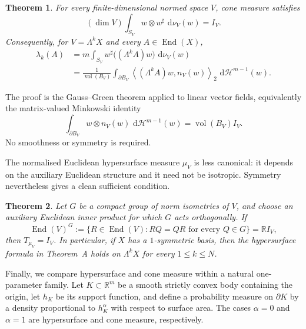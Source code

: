 \documentclass[11pt,a4paper]{amsart}
\numberwithin{equation}{section}
\theoremstyle{plain}
\newtheorem{maintheorem}{Theorem}
\theoremstyle{definition}
\theoremstyle{remark}
\DeclareMathOperator{\End}{End}
\DeclareMathOperator{\vol}{vol}
\newcommand{\R}{\mathbb{R}}
\newcommand{\dd}{\,\mathrm{d}}
\newcommand{\Id}{I}
\newcommand{\ip}[2]{\left\langle #1,#2\right\rangle_2}
\begin{document}
\begin{maintheorem}\label{thm:intro-B}
For every finite-dimensional normed space $V$, cone measure satisfies
\[
(\dim V)\int_{S_V}w\otimes w^\sharp\,\dd\nu_V(w)=\Id_V.
\]
Consequently, for $V=\Lambda^kX$ and every $A\in\End(X)$,
\begin{align*}
\lambda_k(A)
&=m\int_{S_V}w^\sharp\big((\Lambda^kA)w\big)\,\dd\nu_V(w)\\
&=\frac{1}{\vol(B_V)}
  \int_{\partial B_V}\ip{(\Lambda^kA)w}{n_V(w)}\,\dd\mathcal H^{m-1}(w).
\end{align*}
\end{maintheorem}

The proof is the Gauss--Green theorem applied to linear vector fields, equivalently the matrix-valued Minkowski identity
\[
\int_{\partial B_V}w\otimes n_V(w)\,\dd\mathcal H^{m-1}(w)
=\vol(B_V)\Id_V.
\]
No smoothness or symmetry is required.

The normalised Euclidean hypersurface measure $\mu_V$ is less canonical: it depends on the auxiliary Euclidean structure and it need not be isotropic. Symmetry nevertheless gives a clean sufficient condition.

\begin{maintheorem}\label{thm:intro-C}
Let $G$ be a compact group of norm isometries of $V$, and choose an auxiliary Euclidean inner product for which $G$ acts orthogonally. If
\[
\End(V)^G:=\{R\in\End(V):RQ=QR\text{ for every }Q\in G\}=\R\Id_V,
\]
then $T_{\mu_V}=\Id_V$. In particular, if $X$ has a $1$-symmetric basis, then the hypersurface formula in Theorem~\textup{A} holds on $\Lambda^kX$ for every $1\leqslant k\leqslant N$.
\end{maintheorem}

Finally, we compare hypersurface and cone measure within a natural one-parameter family. Let $K\subset\R^m$ be a smooth strictly convex body containing the origin, let $h_K$ be its support function, and define a probability measure on $\partial K$ by a density proportional to $h_K^\alpha$ with respect to surface area. The cases $\alpha=0$ and $\alpha=1$ are hypersurface and cone measure, respectively.
\end{document}
